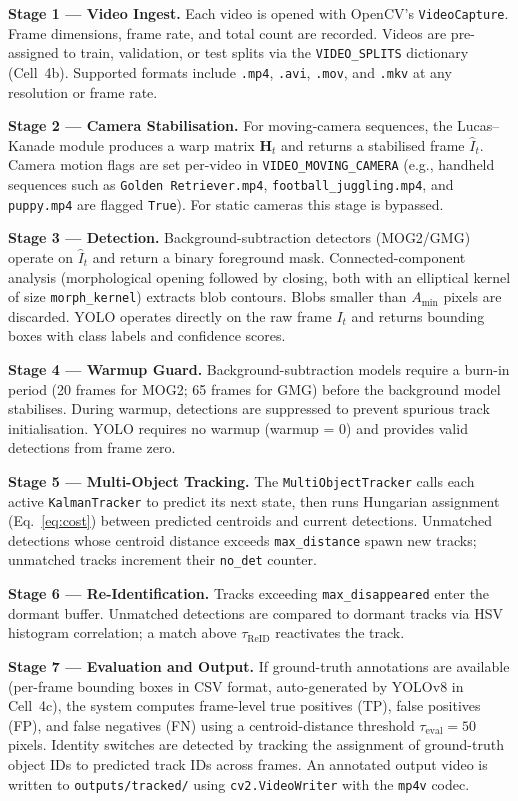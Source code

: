 \documentclass[10pt, conference, compsocconf]{IEEEtran}
\begin{document}
\textbf{Stage 1 — Video Ingest.} Each video is opened with OpenCV's
\texttt{VideoCapture}. Frame dimensions, frame rate, and total count
are recorded. Videos are pre-assigned to train, validation, or test
splits via the \texttt{VIDEO\_SPLITS} dictionary (Cell~4b). Supported
formats include \texttt{.mp4}, \texttt{.avi}, \texttt{.mov}, and
\texttt{.mkv} at any resolution or frame rate.

\textbf{Stage 2 — Camera Stabilisation.} For moving-camera sequences,
the Lucas--Kanade module produces a warp matrix $\mathbf{H}_t$ and
returns a stabilised frame $\hat{I}_t$. Camera motion flags are set
per-video in \texttt{VIDEO\_MOVING\_CAMERA} (e.g., handheld sequences
such as \texttt{Golden Retriever.mp4}, \texttt{football\_juggling.mp4},
and \texttt{puppy.mp4} are flagged \texttt{True}). For static cameras
this stage is bypassed.

\textbf{Stage 3 — Detection.} Background-subtraction detectors
(MOG2/GMG) operate on $\hat{I}_t$ and return a binary foreground
mask. Connected-component analysis (morphological opening followed by
closing, both with an elliptical kernel of size \texttt{morph\_kernel})
extracts blob contours. Blobs smaller than
$A_\text{min}$ pixels are discarded. YOLO operates directly on the
raw frame $I_t$ and returns bounding boxes with class labels and
confidence scores.

\textbf{Stage 4 — Warmup Guard.} Background-subtraction models
require a burn-in period (20 frames for MOG2; 65 frames for GMG)
before the background model stabilises. During warmup, detections
are suppressed to prevent spurious track initialisation. YOLO
requires no warmup (warmup = 0) and provides valid detections
from frame zero.

\textbf{Stage 5 — Multi-Object Tracking.} The \texttt{MultiObjectTracker}
calls each active \texttt{KalmanTracker} to predict its next state,
then runs Hungarian assignment (Eq.~\ref{eq:cost}) between predicted
centroids and current detections. Unmatched detections whose
centroid distance exceeds \texttt{max\_distance} spawn new tracks;
unmatched tracks increment their \texttt{no\_det} counter.

\textbf{Stage 6 — Re-Identification.} Tracks exceeding
\texttt{max\_disappeared} enter the dormant buffer. Unmatched
detections are compared to dormant tracks via HSV histogram
correlation; a match above $\tau_\text{ReID}$ reactivates the track.

\textbf{Stage 7 — Evaluation and Output.} If ground-truth annotations
are available (per-frame bounding boxes in CSV format, auto-generated
by YOLOv8 in Cell~4c), the system computes frame-level
true positives (TP), false positives (FP), and false negatives (FN)
using a centroid-distance threshold $\tau_\text{eval}=50$ pixels.
Identity switches are detected by tracking the assignment of ground-truth
object IDs to predicted track IDs across frames. An annotated output
video is written to \texttt{outputs/tracked/} using
\texttt{cv2.VideoWriter} with the \texttt{mp4v} codec.
\end{document}

